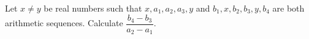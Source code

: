 Let $x\ne y$ be real numbers such that $x,a_1,a_2,a_3,y$ and $b_1,x,b_2,b_3,y,b_4$ are both arithmetic sequences. Calculate $\dfrac{b_4-b_3}{a_2-a_1}$.
